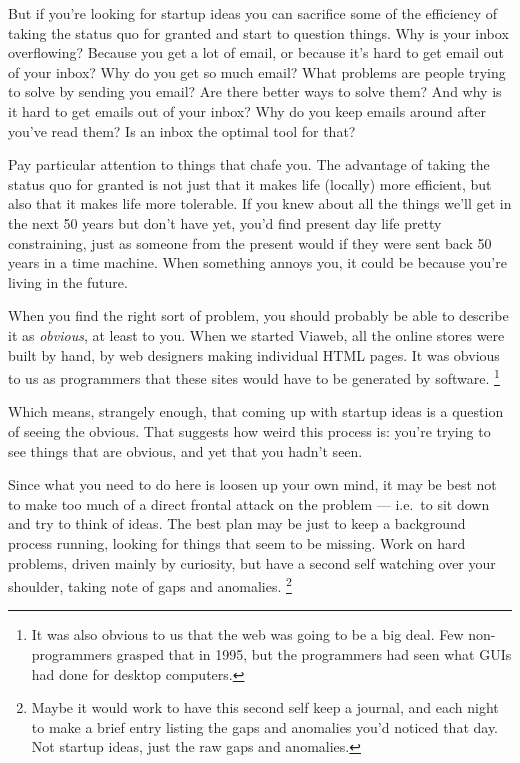 But if you're looking for startup ideas you can sacrifice some of the
efficiency of taking the status quo for granted and start to question
things. Why is your inbox overflowing? Because you get a lot of email,
or because it's hard to get email out of your inbox? Why do you get so
much email? What problems are people trying to solve by sending you
email? Are there better ways to solve them? And why is it hard to get
emails out of your inbox? Why do you keep emails around after you've
read them? Is an inbox the optimal tool for that?

Pay particular attention to things that chafe you. The advantage of
taking the status quo for granted is not just that it makes life
(locally) more efficient, but also that it makes life more tolerable. If
you knew about all the things we'll get in the next 50 years but don't
have yet, you'd find present day life pretty constraining, just as
someone from the present would if they were sent back 50 years in a time
machine. When something annoys you, it could be because you're living in
the future.

When you find the right sort of problem, you should probably be able to
describe it as \emph{obvious}, at least to you. When we started Viaweb,
all the online stores were built by hand, by web designers making
individual HTML pages. It was obvious to us as programmers that these
sites would have to be generated by software. \footnote{It was also obvious to us that the web was going to be a big
deal. Few non-programmers grasped that in 1995, but the programmers had
seen what GUIs had done for desktop computers.}

Which means, strangely enough, that coming up with startup ideas is a
question of seeing the obvious. That suggests how weird this process is:
you're trying to see things that are obvious, and yet that you hadn't
seen.

Since what you need to do here is loosen up your own mind, it may be
best not to make too much of a direct frontal attack on the problem ---
i.e.~to sit down and try to think of ideas. The best plan may be just to
keep a background process running, looking for things that seem to be
missing. Work on hard problems, driven mainly by curiosity, but have a
second self watching over your shoulder, taking note of gaps and
anomalies. \footnote{Maybe it would work to have this second self keep a journal, and
each night to make a brief entry listing the gaps and anomalies you'd
noticed that day. Not startup ideas, just the raw gaps and anomalies.}

